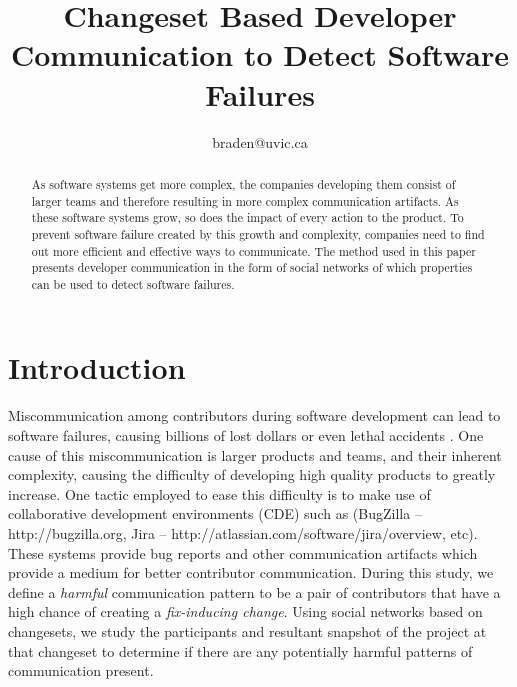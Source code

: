 \documentclass[conference]{IEEEtran}
\begin{document}
\title{Changeset Based Developer Communication to Detect Software Failures}

\author{
braden@uvic.ca}

\maketitle

\begin{abstract}
As software systems get more complex, the companies developing them consist of larger teams and therefore resulting in more complex communication artifacts.  As these software systems grow, so does the impact of every action to the product.  To prevent software failure created by this growth and complexity, companies need to find out more efficient and effective ways to communicate.  The method used in this paper presents developer communication in the form of social networks of which properties can be used to detect software failures.\end{abstract}

\section{Introduction}

Miscommunication among contributors during software development can lead to software failures, causing billions of lost dollars or even lethal accidents \cite{Wolf:2009:PBF:1555001.1555017}. One cause of this miscommunication is larger products and teams, and their inherent complexity, causing the difficulty of developing high quality products to greatly increase.  One tactic employed to ease this difficulty is to make use of collaborative development environments (CDE) such as (BugZilla -- http://bugzilla.org, Jira -- http://atlassian.com/software/jira/overview, etc).  These systems provide bug reports and other communication artifacts which provide a medium for better contributor communication.  During this study, we define a \emph{harmful} communication pattern to be a pair of contributors that have a high chance of creating a \emph{fix-inducing change}.  Using social networks based on changesets, we study the participants and resultant snapshot of the project at that changeset to determine if there are any potentially harmful patterns of communication present.
\end{document}
